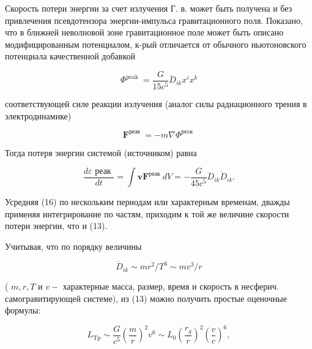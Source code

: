\documentclass[10pt]{article}
\begin{document}
Скорость потери энергии за счет излучения Г. в. может быть получена и без привлечения псевдотензора энергии-импульса гравитационного поля. Показано, что в ближней неволновой зоне гравитационное поле может быть описано модифицированным потенциалом, к-рый отличается от обычного ньютоновского потенциала качественной добавкой



\[

\Phi^{\text {peak }}=\frac{G}{15 c^{5}} \dddot{D}_{i k} x^{i} x^{k}

\]



соответствующей силе реакции излучения (аналог силы радиационного трения в электродинамике)



\[

\boldsymbol{F}^{\text {реак }}=-m \nabla \Phi^{\text {реaк }}

\]



Тогда потеря энергии системой (источником) равна



\[

\frac{d \varepsilon \text { реак }}{d t}=\int \boldsymbol{v} \boldsymbol{F}^{\text {реак }} d V=-\frac{G}{45 c^{5}} \dddot{D}_{i k} \dot{D}_{i k} .

\]



Усредняя (16) по нескольким периодам или характерным временам, дважды применяя интегрирование по частям, приходим к той же величине скорости потери энергии, что и (13).



Учитывая, что по порядку величины



\[

\dddot{D}_{i k} \sim m r^{2} / T^{3} \sim m v^{3} / r

\]



( $m, r, T$ и $v-$ характерные масса, размер, время и скорость в несферич. самогравитирующей системе), из (13) можно получить простые оценочные формулы:



\[

L_{\mathrm{Tp}} \sim \frac{G}{c^{5}}\left(\frac{m}{r}\right)^{2} v^{6} \sim L_{0}\left(\frac{r_{g}}{r}\right)^{2}\left(\frac{v}{c}\right)^{6},

\]
\end{document}
